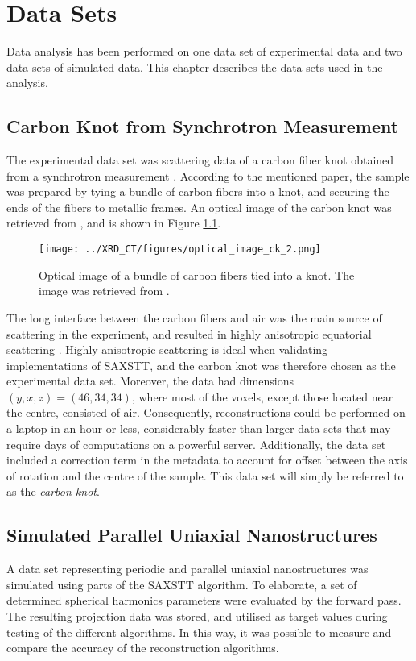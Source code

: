 \chapter{Data Sets} %
\label{ch:reconstruction_data_sets}

Data analysis has been performed on one data set of experimental data and two data sets of simulated data.
This chapter describes the data sets used in the analysis.

\section{Carbon Knot from Synchrotron Measurement} %
\label{sec:data_set_carbon_knot}
The experimental data set was scattering data of a carbon fiber knot obtained from a synchrotron measurement \cite{PMID_30821257}.
According to the mentioned paper, the sample was prepared by tying a bundle of carbon fibers into a knot, and securing the ends of the fibers to metallic frames.
An optical image of the carbon knot was retrieved from \cite{PMID_30821257}, and is shown in Figure \ref{fig:carbon_knot_image}.
\begin{figure}[htbp]
    \centering
    \texttt{[image: ../XRD\_CT/figures/optical\_image\_ck\_2.png]}
    \caption{Optical image of a bundle of carbon fibers tied into a knot. The image was retrieved from \cite{PMID_30821257}.}
    \label{fig:carbon_knot_image}
\end{figure}
The long interface between the carbon fibers and air was the main source of scattering in the experiment, and resulted in highly anisotropic equatorial scattering \cite{PMID_30821257}.
Highly anisotropic scattering is ideal when validating implementations of SAXSTT, and the carbon knot was therefore chosen as the experimental data set.
Moreover, the data had dimensions $(y,x,z) = (46,34,34)$, where most of the voxels, except those located near the centre, consisted of air.
Consequently, reconstructions could be performed on a laptop in an hour or less, considerably faster than larger data sets that may require days of computations on a powerful server.   %
Additionally, the data set included a correction term in the metadata to account for offset between the axis of rotation
and the centre of the sample. This data set will simply be referred to as the \emph{carbon knot}.


\section{Simulated Parallel Uniaxial Nanostructures} %
\label{sec:reconstruction_data_sets_periodic_parallel_uniaxial_nanostructures}
A data set representing periodic and parallel uniaxial nanostructures was simulated using parts of the SAXSTT algorithm.
To elaborate, a set of determined spherical harmonics parameters were evaluated by the forward pass.
The resulting projection data was stored, and utilised as target values during testing of the different algorithms.
In this way, it was possible to measure and compare the accuracy of the reconstruction algorithms.

